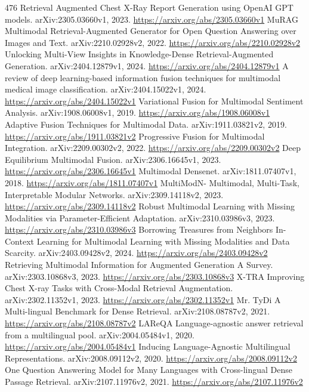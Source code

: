 \documentclass[11pt]{article}
\begin{document}
\begin{thebibliography}{476}
 Retrieval Augmented Chest X-Ray Report Generation using OpenAI GPT models. arXiv:2305.03660v1, 2023. \url{https://arxiv.org/abs/2305.03660v1}
 MuRAG Multimodal Retrieval-Augmented Generator for Open Question Answering over Images and Text. arXiv:2210.02928v2, 2022. \url{https://arxiv.org/abs/2210.02928v2}
 Unlocking Multi-View Insights in Knowledge-Dense Retrieval-Augmented Generation. arXiv:2404.12879v1, 2024. \url{https://arxiv.org/abs/2404.12879v1}
 A review of deep learning-based information fusion techniques for multimodal medical image classification. arXiv:2404.15022v1, 2024. \url{https://arxiv.org/abs/2404.15022v1}
 Variational Fusion for Multimodal Sentiment Analysis. arXiv:1908.06008v1, 2019. \url{https://arxiv.org/abs/1908.06008v1}
 Adaptive Fusion Techniques for Multimodal Data. arXiv:1911.03821v2, 2019. \url{https://arxiv.org/abs/1911.03821v2}
 Progressive Fusion for Multimodal Integration. arXiv:2209.00302v2, 2022. \url{https://arxiv.org/abs/2209.00302v2}
 Deep Equilibrium Multimodal Fusion. arXiv:2306.16645v1, 2023. \url{https://arxiv.org/abs/2306.16645v1}
 Multimodal Densenet. arXiv:1811.07407v1, 2018. \url{https://arxiv.org/abs/1811.07407v1}
 MultiModN- Multimodal, Multi-Task, Interpretable Modular Networks. arXiv:2309.14118v2, 2023. \url{https://arxiv.org/abs/2309.14118v2}
 Robust Multimodal Learning with Missing Modalities via Parameter-Efficient Adaptation. arXiv:2310.03986v3, 2023. \url{https://arxiv.org/abs/2310.03986v3}
 Borrowing Treasures from Neighbors In-Context Learning for Multimodal Learning with Missing Modalities and Data Scarcity. arXiv:2403.09428v2, 2024. \url{https://arxiv.org/abs/2403.09428v2}
 Retrieving Multimodal Information for Augmented Generation A Survey. arXiv:2303.10868v3, 2023. \url{https://arxiv.org/abs/2303.10868v3}
 X-TRA Improving Chest X-ray Tasks with Cross-Modal Retrieval Augmentation. arXiv:2302.11352v1, 2023. \url{https://arxiv.org/abs/2302.11352v1}
 Mr. TyDi A Multi-lingual Benchmark for Dense Retrieval. arXiv:2108.08787v2, 2021. \url{https://arxiv.org/abs/2108.08787v2}
 LAReQA Language-agnostic answer retrieval from a multilingual pool. arXiv:2004.05484v1, 2020. \url{https://arxiv.org/abs/2004.05484v1}
 Inducing Language-Agnostic Multilingual Representations. arXiv:2008.09112v2, 2020. \url{https://arxiv.org/abs/2008.09112v2}
 One Question Answering Model for Many Languages with Cross-lingual Dense Passage Retrieval. arXiv:2107.11976v2, 2021. \url{https://arxiv.org/abs/2107.11976v2}

\end{thebibliography}
\end{document}
